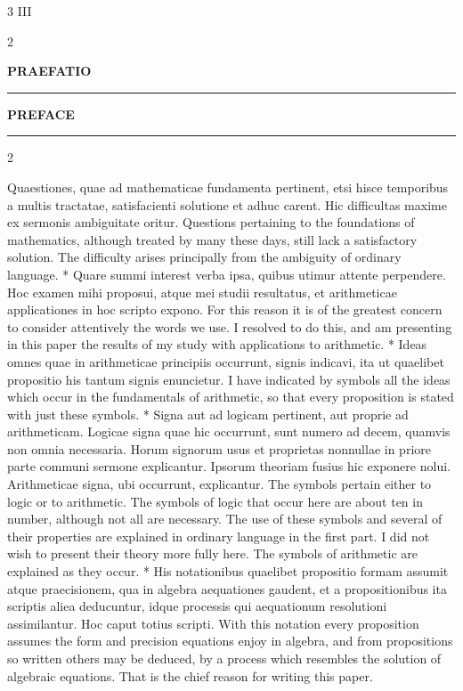 \documentclass{book}
\newcommand{\s}{\switchcolumn} %
\newcommand\peanoHeadingLarge[1]{ \vspace{2cm} {\Large \textbf{\uppercase{#1}} \nopagebreak[4]}

  \noindent\rule{2cm}{0.4pt} \nopagebreak[1]}
\newcommand{\peanoPage}[1]{\vspace{1ex}

  \columnratio{0.475, 0.05, 0.475} \begin{paracol}{3} \centering \hdashrule{\columnwidth}{0.1mm}{0.1mm 1mm} \s #1 \s \hdashrule{\columnwidth}{0.1mm}{0.1mm 1mm} \end{paracol}

\vspace{1ex}}
\newenvironment{translateTwoCol}
               { %
                 \columnratio{0.5, 0.5}
                 \begin{paracol}{2}
                 \newcommand{\LAT}{\switchcolumn[0]*}
                 \newcommand{\ENG}{\switchcolumn[1]}
               }
               { %
                 \let\ENG\undefined
                 \let\LAT\undefined
                 \end{paracol}
               }
\begin{document}
\pagebreak

\vspace{1em}
\peanoPage{III} %

\begin{translateTwoCol}
\centering
{}
{}
\peanoHeadingLarge{Praefatio}
\ENG
\peanoHeadingLarge{Preface}
\end{translateTwoCol}

\begin{translateTwoCol}
Quaestiones, quae ad mathematicae fundamenta pertinent, etsi hisce temporibus a multis tractatae, satisfacienti solutione et adhuc carent. Hic difficultas maxime ex sermonis ambiguitate oritur.
\ENG Questions pertaining to the foundations of mathematics, although treated by many these days, still lack a satisfactory solution. The difficulty arises principally from the ambiguity of ordinary language.
\LAT
Quare summi interest verba ipsa, quibus utimur attente perpendere. Hoc examen mihi proposui, atque mei studii resultatus, et arithmeticae applicationes in hoc scripto expono.
\ENG For this reason it is of the greatest concern to consider attentively the words we use. I resolved to do this, and am presenting in this paper the results of my study with applications to arithmetic.
\LAT
Ideas omnes quae in arithmeticae principiis occurrunt, signis indicavi, ita ut quaelibet propositio his tantum signis enuncietur.
\ENG I have indicated by symbols all the ideas which occur in the fundamentals of arithmetic, so that every proposition is stated with just these symbols.
\LAT
Signa aut ad logicam pertinent, aut proprie ad arithmeticam. Logicae signa quae hic occurrunt, sunt numero ad decem, quamvis non omnia necessaria. Horum signorum usus et proprietas nonnullae in priore parte communi sermone explicantur. Ipsorum theoriam fusius hic exponere nolui. Arithmeticae signa, ubi occurrunt, explicantur.
\ENG The symbols pertain either to logic or to arithmetic. The symbols of logic that occur here are about ten in number, although not all are necessary. The use of these symbols and several of their properties are explained in ordinary language in the first part. I did not wish to present their theory more fully here. The symbols of arithmetic are explained as they occur.
\LAT
His notationibus quaelibet propositio formam assumit atque praecisionem, qua in algebra aequationes gaudent, et a propositionibus ita scriptis aliea deducuntur, idque processis qui aequationum resolutioni assimilantur. Hoc caput totius scripti.
\ENG With this notation every proposition assumes the form and precision equations enjoy in algebra, and from propositions so written others may be deduced, by a process which resembles the solution of algebraic equations. That is the chief reason for writing this paper.

\end{translateTwoCol}
\end{document}
